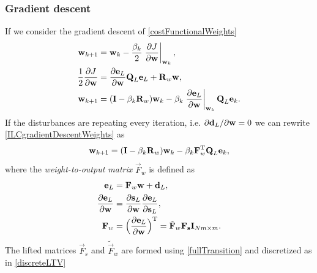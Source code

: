 \subsubsection{Gradient descent} If we consider the gradient descent of \eqref{costFunctionalWeights}
%
\begin{equation}
\begin{aligned}
\boldsymbol{\mathrm{w}}_{k+1} &= \boldsymbol{\mathrm{w}}_k - \frac{\beta_k}{2} \left.\frac{\partial{J}}{\partial{\boldsymbol{\mathrm{w}}}}\right|_{\boldsymbol{\mathrm{w}}_k}, \\
\frac{1}{2}\frac{\partial{J}}{\partial{\boldsymbol{\mathrm{w}}}} &= \frac{\partial{\boldsymbol{\mathrm{e}}_L}}{\partial{\boldsymbol{\mathrm{w}}}}\boldsymbol{\mathrm{Q}}_L\boldsymbol{\mathrm{e}}_L + \boldsymbol{\mathrm{R}}_w\boldsymbol{\mathrm{w}}, \\
\boldsymbol{\mathrm{w}}_{k+1} &= (\boldsymbol{\mathrm{I}} - \beta_k\boldsymbol{\mathrm{R}}_w)\boldsymbol{\mathrm{w}}_k - \beta_k\left.\frac{\partial{\boldsymbol{\mathrm{e}}_L}}{\partial{\boldsymbol{\mathrm{w}}}}\right|_{\boldsymbol{\mathrm{w}}_k}\boldsymbol{\mathrm{Q}}_L\boldsymbol{\mathrm{e}}_k.
\end{aligned}
\label{ILCgradientDescentWeights}
\end{equation}
%
\noindent If the disturbances are repeating every iteration, i.e. $\partial{\boldsymbol{\mathrm{d}}_L}/{\partial{\boldsymbol{\mathrm{w}}}} = 0$ we can rewrite \eqref{ILCgradientDescentWeights} as
%
\begin{equation}
\begin{aligned}
\boldsymbol{\mathrm{w}}_{k+1} = (\boldsymbol{\mathrm{I}} - \beta_k\boldsymbol{\mathrm{R}}_w)\boldsymbol{\mathrm{w}}_k - \beta_k\boldsymbol{\mathrm{F}}_{w}^\mathrm{T}\boldsymbol{\mathrm{Q}}_L\boldsymbol{\mathrm{e}}_k,
\end{aligned}
\label{ILCgradientDescentWeights2}
\end{equation}
%
\noindent where the \emph{weight-to-output matrix} $\vec{F}_{w}$ is defined as
%
\begin{equation}
\begin{aligned}
\boldsymbol{\mathrm{e}}_L &= \boldsymbol{\mathrm{F}}_{w}\boldsymbol{\mathrm{w}} + \boldsymbol{\mathrm{d}}_L, \\
\frac{\partial{\boldsymbol{\mathrm{e}}_L}}{\partial{\boldsymbol{\mathrm{w}}}} &= \frac{\partial{\boldsymbol{\mathrm{s}}_L}}{\partial{\boldsymbol{\mathrm{w}}}}\frac{\partial{\boldsymbol{\mathrm{e}}_L}}{\partial{\boldsymbol{\mathrm{s}}_L}}, \\
\boldsymbol{\mathrm{F}}_{w} &= \Big(\frac{\partial{\boldsymbol{\mathrm{e}}_L}}{\partial{\boldsymbol{\mathrm{w}}}}\Big)^{\mathrm{T}} = \tilde{\boldsymbol{\mathrm{F}}}_{w}\boldsymbol{\mathrm{F}}_{\boldsymbol{\mathrm{s}}}\boldsymbol{\mathrm{I}}_{Nm \times m}.
\end{aligned}
\label{weightToOutputMatrix1}
\end{equation}
%
\noindent The lifted matrices $\vec{F}_{s}$ and $\tilde{\vec{F}}_{w}$ are formed using \eqref{fullTransition} and discretized as in \eqref{discreteLTV}
%
